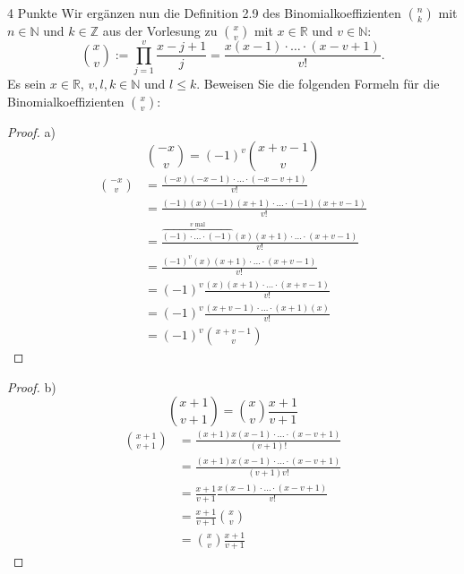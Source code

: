 \documentclass{problemset}
\begin{document}
\begin{problem}{4 Punkte}
Wir ergänzen nun die Definition 2.9 des Binomialkoeffizienten $n \choose k$ mit
$n \in \mathbb{N}$ und $k \in \mathbb{Z}$ aus der Vorlesung zu $x \choose v$
mit $x \in \mathbb{R}$ und $v \in \mathbb{N}$:
\[
    \binom{x}{v} := \prod_{j=1}^{v}\frac{x-j+1}{j} = \frac{x(x-1)\cdot\ldots\cdot(x-v+1)}{v!}.
\]
Es sein $x \in \mathbb{R}$, $v,l,k \in \mathbb{N}$ und $l \le k$. Beweisen Sie
die folgenden Formeln für die Binomialkoeffizienten $\binom{x}{v}$:
\begin{proof}
    a)
    \begin{displaymath}
        \binom{-x}{v} = (-1)^v\binom{x+v-1}{v}
    \end{displaymath}
    \begin{align}
        \binom{-x}{v} & = \frac{(-x)(-x-1)\cdot\ldots\cdot(-x-v+1)}{v!}                                                 \\
                      & = \frac{(-1)(x)(-1)(x+1)\cdot\ldots\cdot(-1)(x+v-1)}{v!}                                        \\
                      & = \frac{\overbrace{(-1)\cdot\ldots\cdot(-1)}^{v\text{ mal}}(x)(x+1)\cdot\ldots\cdot(x+v-1)}{v!} \\
                      & = \frac{(-1)^v(x)(x+1)\cdot\ldots\cdot(x+v-1)}{v!}                                              \\
                      & = (-1)^v\frac{(x)(x+1)\cdot\ldots\cdot(x+v-1)}{v!}                                              \\
                      & = (-1)^v\frac{(x+v-1)\cdot\ldots\cdot(x+1)(x)}{v!}                                              \\
                      & = (-1)^v\binom{x+v-1}{v}
    \end{align}
\end{proof}
\begin{proof}
    b)
    \begin{displaymath}
        \binom{x+1}{v+1} = \binom{x}{v}\frac{x+1}{v+1}
    \end{displaymath}
    \begin{align}
        \binom{x+1}{v+1} & = \frac{(x+1)x(x-1)\cdot\ldots\cdot(x-v+1)}{(v+1)!}        \\
                         & = \frac{(x+1)x(x-1)\cdot\ldots\cdot(x-v+1)}{(v+1)v!}       \\
                         & = \frac{x+1}{v+1} \frac{x(x-1)\cdot\ldots\cdot(x-v+1)}{v!} \\
                         & = \frac{x+1}{v+1} \binom{x}{v}                             \\
                         & = \binom{x}{v} \frac{x+1}{v+1}
    \end{align}


\end{proof}
\end{problem}
\end{document}
